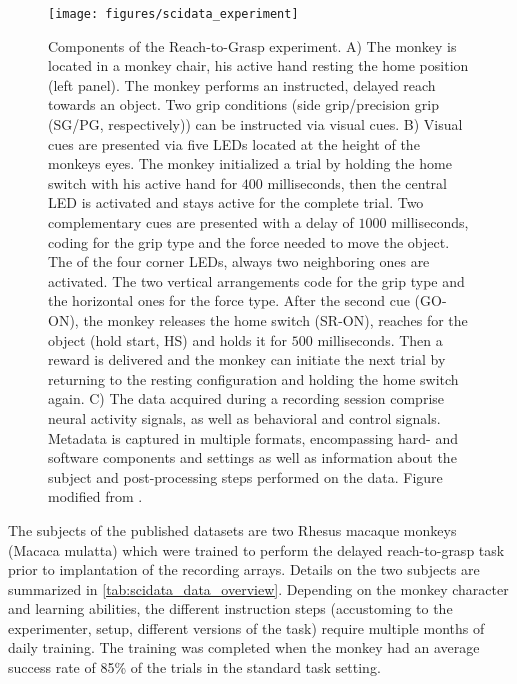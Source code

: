 \begin{figure}[htbp]
\centering
\texttt{[image: figures/scidata\_experiment]}
\caption[Components of the Reach-to-Grasp experiment]{Components of the Reach-to-Grasp experiment. A) The monkey is located in a monkey chair, his active hand resting the home position (left panel). The monkey performs an instructed, delayed reach towards an object. Two grip conditions (side grip/precision grip (SG/PG, respectively)) can be instructed via visual cues. B) Visual cues are presented via five LEDs located at the height of the monkeys eyes. The monkey initialized a trial by holding the home switch with his active hand for $400$ milliseconds, then the central LED is activated and stays active for the complete trial. Two complementary cues are presented with a delay of $1000$ milliseconds, coding for the grip type and the force needed to move the object. The of the four corner LEDs, always two neighboring ones are activated. The two vertical arrangements code for the grip type and the horizontal ones for the force type. After the second cue (GO-ON), the monkey releases the home switch (SR-ON), reaches for the object (hold start, HS) and holds it for $500$ milliseconds. Then a reward is delivered and the monkey can initiate the next trial by returning to the resting configuration and holding the home switch again. C) The data acquired during a recording session comprise neural activity signals, as well as behavioral and control signals. Metadata is captured in multiple formats, encompassing hard- and software components and settings as well as information about the subject and post-processing steps performed on the data. Figure modified from \citet{Brochier_2018}.}
\label{fig:r2g_introduction}
\end{figure}

The subjects of the published datasets are two Rhesus macaque monkeys (Macaca mulatta) which were trained to perform the delayed reach-to-grasp task prior to implantation of the recording arrays. Details on the two subjects are summarized in \cref{tab:scidata_data_overview}. Depending on the monkey character and learning abilities, the different instruction steps (accustoming to the experimenter, setup, different versions of the task) require multiple months of daily training. The training was completed when the monkey had an average success rate of 85\% of the trials in the standard task setting.

